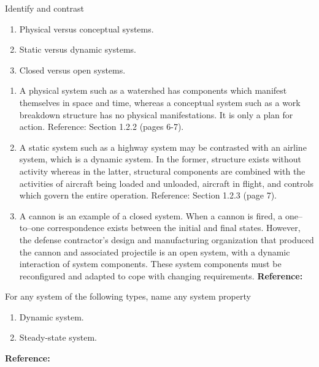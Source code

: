 \begin{exercises}
    \begin{exercise} 
    \label{sea-1-6_7_8}
        Identify and contrast
        \begin{enumerate}[label=\alph*)]
            \item Physical versus conceptual systems.
            \item Static versus dynamic systems.
            \item Closed versus open systems.
        \end{enumerate}
    \end{exercise}
    \begin{solution}
        \begin{enumerate}[label=\alph*)]
            \item A physical system such as a watershed has components which manifest themselves in space and time, whereas a conceptual system such as a work breakdown structure has no physical manifestations. It is only a plan for action. Reference: Section 1.2.2 (pages 6-7).
            \item A static system such as a highway system may be contrasted with an airline system, which is a dynamic system. In the former, structure exists without activity whereas in the latter, structural components are combined with the activities of aircraft being loaded and unloaded, aircraft in flight, and controls which govern the entire operation. Reference: Section 1.2.3 (page 7).
            \item A cannon is an example of a closed system. When a cannon is fired, a one–to–one correspondence exists between the initial and final states. However, the defense contractor’s design and manufacturing organization that produced the cannon and associated projectile is an open system, with a dynamic interaction of system components. These system components must be reconfigured and adapted to cope with changing requirements. \textbf{Reference:}
        \end{enumerate}
    \end{solution}
    
    \begin{exercise} 
    \label{sea-1-15}
        For any system of the following types, name any system property
        \begin{enumerate}[label=\alph*)]
            \item Dynamic system.
            \item Steady-state system.
        \end{enumerate}
    \end{exercise}
    \begin{solution}
        \textbf{Reference:}
    \end{solution}
    

\end{exercises}
